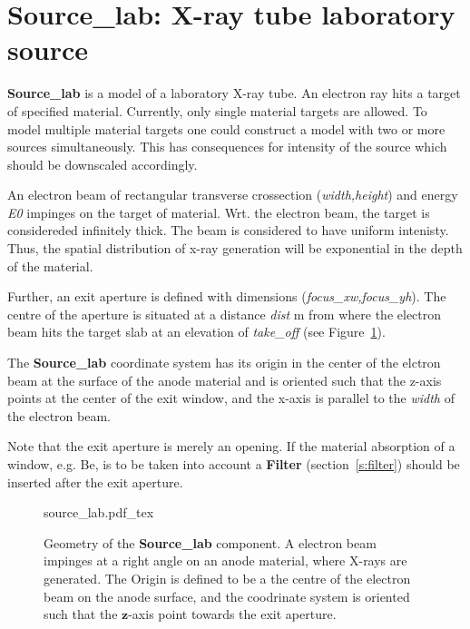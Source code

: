 \section{Source\_lab: X-ray tube laboratory source}
\label{s:source-lab}


\textbf{Source\_lab} is a model of a laboratory X-ray tube. An electron ray hits a
target of specified material. Currently, only single material targets are
allowed. To model multiple material targets one could construct a model with two
or more sources simultaneously. This has consequences for intensity of the source which should be downscaled accordingly.

An electron beam of rectangular transverse crossection (\textit{width,height}) and energy \textit{E0}
impinges on the target of material. Wrt. the electron beam, the target is
considereded infinitely thick. The beam is considered to have uniform
intenisty. Thus, the spatial distribution of x-ray generation will be
exponential in the depth of the material.

Further, an exit aperture is defined with dimensions
(\textit{focus\_xw,focus\_yh}). The centre of the aperture is situated at a
distance \textit{dist} \si{m} from where the electron beam hits the target slab
at an elevation of \textit{take\_off} (see Figure~\ref{f:source_lab}).  

The \textbf{Source\_lab} coordinate system has its origin in the center of the
elctron beam at the surface of the
anode material and is oriented such that the z-axis points at the center of the
exit window, and the x-axis is parallel to the \emph{width} of the electron
beam. 

Note that the exit aperture is merely an opening. If the
material absorption of a window, e.g. Be, is to be taken into account a
\textbf{Filter} (section~\ref{s:filter}) should be inserted after the exit
aperture. 

\begin{figure}
\label{f:source_lab}
\centering
\def\svgwidth{\columnwidth}
%
{source_lab.pdf_tex}
\caption{Geometry of the \textbf{Source\_lab} component. A electron beam impinges at a right angle on
an anode material, where X-rays are generated. The Origin is defined to be a the centre of the electron beam
on the anode surface, and the coodrinate system is oriented such that the $\boldsymbol{z}$-axis point towards
the exit aperture.} 
\end{figure}

